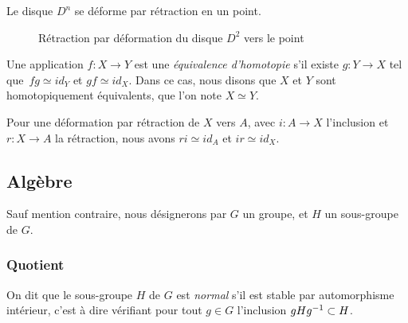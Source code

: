 \begin{exemple}
Le disque $D^{n}$ se déforme par rétraction en un point.

\begin{figure}[H]
    \centering
    \caption{Rétraction par déformation du disque $D^2$ vers le point}
    \label{fig:def-retract-disk}
\end{figure}
\end{exemple}

\begin{definition}\label{def:homotopy-equiv}
Une application $f:X\to Y$ est une \emph{équivalence d'homotopie} s'il existe $g:Y\to X$ tel que~$fg\simeq id_Y$ et $gf\simeq id_X$. Dans ce cas, nous disons que $X$ et $Y$ sont homotopiquement équivalents, que l'on note $X\simeq Y$.
\end{definition}

\begin{exemple}
Pour une déformation par rétraction de $X$ vers $A$, avec $i:A\to X$ l'inclusion et $r:X\to A$ la rétraction, nous avons $ri\simeq id_A$ et $ir\simeq id_X$.
\end{exemple}

\subsection{Algèbre}

Sauf mention contraire, nous désignerons par $G$ un groupe, et $H$ un sous-groupe de $G$.

\subsubsection{Quotient}

\begin{definition}
On dit que le sous-groupe $H$ de $G$ est \emph{normal} s'il est stable par automorphisme intérieur, c'est à dire vérifiant pour tout $g\in G$ l'inclusion $gHg^{-1}\subset H$.
\end{definition}

